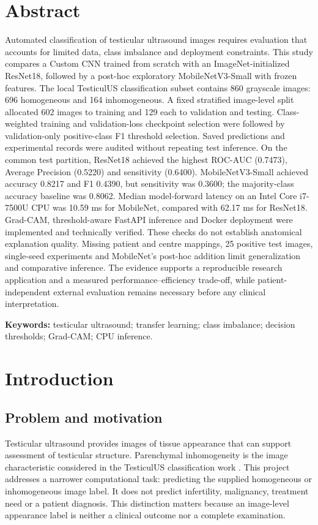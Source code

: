 \documentclass[11pt,a4paper]{article}
\begin{document}
\section*{Abstract}
Automated classification of testicular ultrasound images requires evaluation that accounts for limited data, class imbalance and deployment constraints. This study compares a Custom CNN trained from scratch with an ImageNet-initialized ResNet18, followed by a post-hoc exploratory MobileNetV3-Small with frozen features. The local TesticulUS classification subset contains 860 grayscale images: 696 homogeneous and 164 inhomogeneous. A fixed stratified image-level split allocated 602 images to training and 129 each to validation and testing. Class-weighted training and validation-loss checkpoint selection were followed by validation-only positive-class F1 threshold selection. Saved predictions and experimental records were audited without repeating test inference. On the common test partition, ResNet18 achieved the highest ROC-AUC (0.7473), Average Precision (0.5220) and sensitivity (0.6400). MobileNetV3-Small achieved accuracy 0.8217 and F1 0.4390, but sensitivity was 0.3600; the majority-class accuracy baseline was 0.8062. Median model-forward latency on an Intel Core i7-7500U CPU was 10.59 ms for MobileNet, compared with 62.17 ms for ResNet18. Grad-CAM, threshold-aware FastAPI inference and Docker deployment were implemented and technically verified. These checks do not establish anatomical explanation quality. Missing patient and centre mappings, 25 positive test images, single-seed experiments and MobileNet's post-hoc addition limit generalization and comparative inference. The evidence supports a reproducible research application and a measured performance--efficiency trade-off, while patient-independent external evaluation remains necessary before any clinical interpretation.

\vspace{3mm}
\textbf{Keywords:} testicular ultrasound; transfer learning; class imbalance; decision thresholds; Grad-CAM; CPU inference.
\newpage
{\small\setlength{\parskip}{0pt}\tableofcontents}
\newpage
{}

\section{Introduction}
\subsection{Problem and motivation}
Testicular ultrasound provides images of tissue appearance that can support assessment of testicular structure. Parenchymal inhomogeneity is the image characteristic considered in the TesticulUS classification work \citep{2025ICIAP}. This project addresses a narrower computational task: predicting the supplied homogeneous or inhomogeneous image label. It does not predict infertility, malignancy, treatment need or a patient diagnosis. This distinction matters because an image-level appearance label is neither a clinical outcome nor a complete examination.
\end{document}
